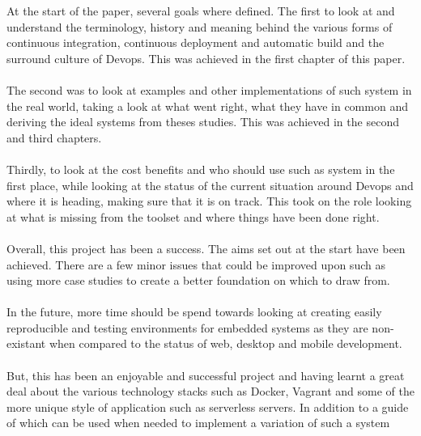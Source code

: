 At the start of the paper, several goals where defined. The first to look at and understand the terminology, history and meaning behind the various forms of continuous integration, continuous deployment and automatic build and the surround culture of Devops. This was achieved in the first chapter of this paper.
\\\\
The second was to look at examples and other implementations of such system in the real world, taking a look at what went right, what they have in common and deriving the ideal systems from theses studies. This was achieved in the second and third chapters.
\\\\
Thirdly, to look at the cost benefits and who should use such as system in the first place, while looking at the status of the current situation around Devops and where it is heading, making sure that it is on track. This took on the role looking at what is missing from the toolset and where things have been done right.
\\\\
Overall, this project has been a success. The aims set out at the start have been achieved. There are a few minor issues that could be improved upon such as using more case studies to create a better foundation on which to draw from. 
\\\\
In the future, more time should be spend towards looking at creating easily reproducible and testing environments for embedded systems as they are non-existant when compared to the status of web, desktop and mobile development.
\\\\
But, this has been an enjoyable and successful project and having learnt a great deal about the various technology stacks such as Docker, Vagrant and some of the more unique style of application such as serverless servers. In addition to a guide of which can be used when needed to implement a variation of such a system